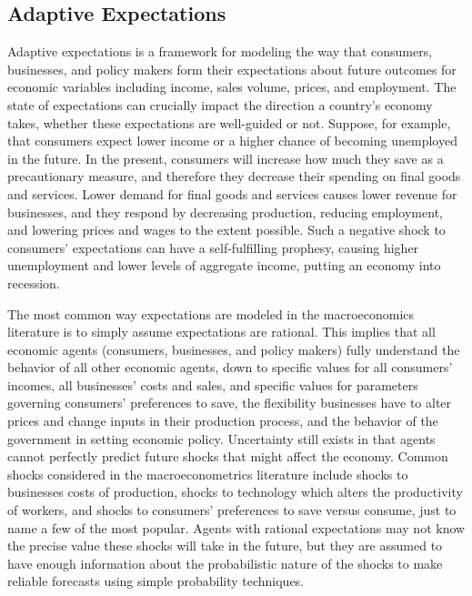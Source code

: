\documentclass[11pt]{article}
\begin{document}
\subsection{Adaptive Expectations}
Adaptive expectations is a framework for modeling the way that consumers, businesses, and policy makers form their expectations about future outcomes for economic variables including income, sales volume, prices, and employment.  The state of expectations can crucially impact the direction a country's economy takes, whether these expectations are well-guided or not.  Suppose, for example, that consumers expect lower income or a higher chance of becoming unemployed in the future.  In the present, consumers will increase how much they save as a precautionary measure, and therefore they decrease their spending on final goods and services.  Lower demand for final goods and services causes lower revenue for businesses, and they respond by decreasing production, reducing employment, and lowering prices and wages to the extent possible.  Such a negative shock to consumers' expectations can have a self-fulfilling prophesy, causing higher unemployment and lower levels of aggregate income, putting an economy into recession.

The most common way expectations are modeled in the macroeconomics literature is to simply assume expectations are rational.  This implies that all economic agents (consumers, businesses, and policy makers) fully understand the behavior of all other economic agents, down to specific values for all consumers' incomes, all businesses' costs and sales, and specific values for parameters governing consumers' preferences to save, the flexibility businesses have to alter prices and change inputs in their production process, and the behavior of the government in setting economic policy.  Uncertainty still exists in that agents cannot perfectly predict future shocks that might affect the economy.  Common shocks considered in the macroeconometrics literature include shocks to businesses costs of production, shocks to technology which alters the productivity of workers, and shocks to consumers' preferences to save versus consume, just to name a few of the most popular.  Agents with rational expectations may not know the precise value these shocks will take in the future, but they are assumed to have enough information about the probabilistic nature of the shocks to make reliable forecasts using simple probability techniques.  
\end{document}
